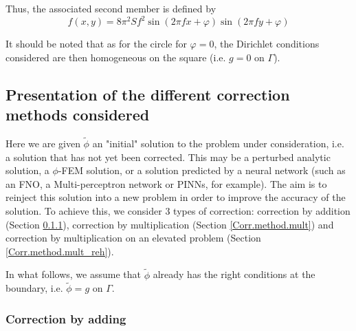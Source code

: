 Thus, the associated second member is defined by
\begin{equation*}
	f(x,y)=8\pi^2 Sf^2\sin\left(2\pi fx + \varphi\right)\sin\left(2\pi fy + \varphi\right)
\end{equation*}

\begin{Rem}
	It should be noted that as for the circle for $\varphi=0$, the Dirichlet conditions considered are then homogeneous on the square (i.e. $g=0$ on $\Gamma$).
\end{Rem}

\subsection{Presentation of the different correction methods considered} \label{Corr.methods}

Here we are given $\tilde{\phi}$ an "initial" solution to the problem under consideration, i.e. a solution that has not yet been corrected. This may be a perturbed analytic solution, a $\phi$-FEM solution, or a solution predicted by a neural network (such as an FNO, a Multi-perceptron network or PINNs, for example). The aim is to reinject this solution into a new problem in order to improve the accuracy of the solution. To achieve this, we consider 3 types of correction: correction by addition (Section \ref{Corr.method.add}), correction by multiplication (Section \ref{Corr.method.mult}) and correction by multiplication on an elevated problem (Section \ref{Corr.method.mult_reh}).

\begin{Rem}
	In what follows, we assume that $\tilde{\phi}$ already has the right conditions at the boundary, i.e. $\tilde{\phi}=g$ on $\Gamma$.
\end{Rem}

\subsubsection{Correction by adding} \label{Corr.method.add}

